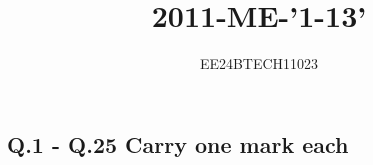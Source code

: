 \documentclass[journal,12pt,onecolumn]{IEEEtran}
\theoremstyle{remark}
\begin{document}

\vspace{3cm}


\title{2011-ME-'1-13'}
\author{EE24BTECH11023}
\maketitle

\subsection*{Q.1 - Q.25 Carry one mark each}


{\let\newpage\relax\maketitle}

\renewcommand{\thefigure}{\theenumi}
\renewcommand{\thetable}{\theenumi}
\setlength{\intextsep}{10pt} %


\renewcommand{\thetable}{\theenumi}
\end{document}

